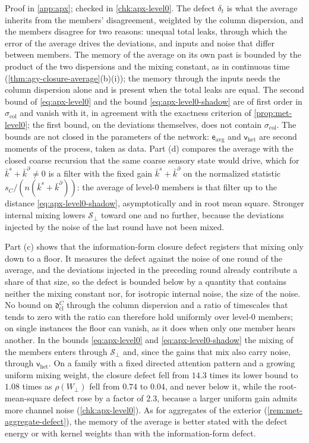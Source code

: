 Proof in \cref{app:apx}; checked in \cref{chk:apx-level0}. The defect $\delta_t$ is what the average inherits from the members' disagreement, weighted by the column dispersion, and the members disagree for two reasons: unequal total leaks, through which the error of the average drives the deviations, and inputs and noise that differ between members. The memory of the average on its own past is bounded by the product of the two dispersions and the mixing constant, as in continuous time (\cref{thm:agy-closure-average}(b)(i)); the memory through the inputs needs the column dispersion alone and is present when the total leaks are equal. The second bound of \eqref{eq:apx-level0} and the bound \eqref{eq:apx-level0-shadow} are of first order in $\sigma_{\mathrm{col}}$ and vanish with it, in agreement with the exactness criterion of \cref{prop:met-level0}; the first bound, on the deviations themselves, does not contain $\sigma_{\mathrm{col}}$. The bounds are not closed in the parameters of the network: $\mathsf e_{\mathrm{avg}}$ and $\mathsf v_{\mathrm{het}}$ are second moments of the process, taken as data. Part (d) compares the average with the closed coarse recursion that the same coarse sensory state would drive, which for $\bar k^s+\bar k^\partial\ne0$ is a filter with the fixed gain $\bar k^s+\bar k^\partial$ on the normalized statistic $s_C/(n(\bar k^s+\bar k^\partial))$: the average of level-0 members is that filter up to the distance \eqref{eq:apx-level0-shadow}, asymptotically and in root mean square. Stronger internal mixing lowers $\mathcal S_\perp$ toward one and no further, because the deviations injected by the noise of the last round have not been mixed.

Part (c) shows that the information-form closure defect registers that mixing only down to a floor. It measures the defect against the noise of one round of the average, and the deviations injected in the preceding round already contribute a share of that size, so the defect is bounded below by a quantity that contains neither the mixing constant nor, for isotropic internal noise, the size of the noise. No bound on $\mathfrak d^C_{\mathrm{cl}}$ through the column dispersion and a ratio of timescales that tends to zero with the ratio can therefore hold uniformly over level-0 members; on single instances the floor can vanish, as it does when only one member hears another. In the bounds \eqref{eq:apx-level0} and \eqref{eq:apx-level0-shadow} the mixing of the members enters through $\mathcal S_\perp$ and, since the gains that mix also carry noise, through $\mathsf v_{\mathrm{het}}$. On a family with a fixed directed attention pattern and a growing uniform mixing weight, the closure defect fell from $14.3$ times its lower bound to $1.08$ times as $\rho(W_\perp)$ fell from $0.74$ to $0.04$, and never below it, while the root-mean-square defect rose by a factor of $2.3$, because a larger uniform gain admits more channel noise (\cref{chk:apx-level0}). As for aggregates of the exterior (\cref{rem:met-aggregate-defect}), the memory of the average is better stated with the defect energy or with kernel weights than with the information-form defect.

